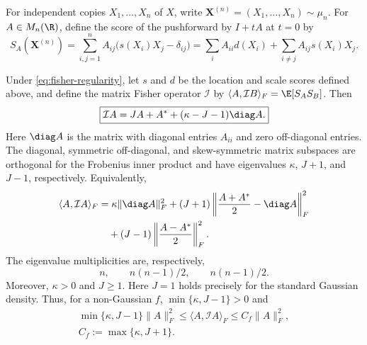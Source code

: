 For independent copies $X_1,\ldots,X_n$ of $X$, write
$\mathbf X^{(n)}=(X_1,\ldots,X_n)\sim\mu_n$.  For
$A\in M_n(\R)$, define the score of the pushforward by $I+tA$ at $t=0$ by
\begin{equation}
 S_A(\mathbf X^{(n)})=\sum_{i,j=1}^n A_{ij}
       \bigl(s(X_i)X_j-\delta_{ij}\bigr)
       =\sum_i A_{ii}d(X_i)+\sum_{i\ne j}A_{ij}s(X_i)X_j.
 \label{eq:matrix-score}
\end{equation}

\begin{theorem}
\label{thm:fisher-spectrum}
Under \eqref{eq:fisher-regularity}, let \(s\) and \(d\) be the location and
scale scores defined above, and define the matrix Fisher operator
$\mathcal I$ by
$\langle A,\mathcal I B\rangle_F=\E[S_AS_B]$.
Then
\begin{equation}
 \boxed{\mathcal I A=JA+A^*
                     +(\kappa-J-1)\diag A.}
 \label{eq:fisher-operator-spectrum}
\end{equation}
Here $\diag A$ is the matrix with diagonal entries $A_{ii}$ and zero
off-diagonal entries.  The diagonal, symmetric off-diagonal, and skew-symmetric matrix subspaces
are orthogonal for the Frobenius inner product and have eigenvalues
$\kappa$, $J+1$, and $J-1$, respectively.  Equivalently,
\begin{equation}
 \begin{aligned}
 \langle A,\mathcal I A\rangle_F
 &=\kappa\|\diag A\|_F^2
   +(J+1)\left\|\frac{A+A^*}2-\diag A\right\|_F^2\\
 &\quad +(J-1)\left\|\frac{A-A^*}2\right\|_F^2.
 \end{aligned}
 \label{eq:fisher-decomposition}
\end{equation}
The eigenvalue multiplicities are, respectively,
\begin{equation}
 n,\qquad n(n-1)/2,\qquad n(n-1)/2.
 \label{eq:fisher-multiplicities}
\end{equation}
Moreover, $\kappa>0$ and $J\ge1$.
Here $J=1$ holds precisely for the
standard Gaussian density.  Thus, for a non-Gaussian $f$,
$\min\{\kappa,J-1\}>0$ and
\begin{equation}
 \begin{gathered}
 \min\{\kappa,J-1\}\|A\|_F^2\le\langle A,\mathcal I A\rangle_F
 \le C_f\|A\|_F^2,\\
 C_f:=\max\{\kappa,J+1\}.
 \end{gathered}
 \label{eq:fisher-ellipticity}
\end{equation}
\end{theorem}

